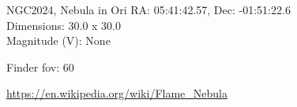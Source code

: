 \begin{block}{NGC2024, Nebula in Ori}
    RA: 05:41:42.57, Dec: -01:51:22.6 \\ 
    Dimensions: 30.0 x 30.0 \\ 
    Magnitude (V): None



    Finder fov: 60 

    \url{https://en.wikipedia.org/wiki/Flame_Nebula} 
\end{block}